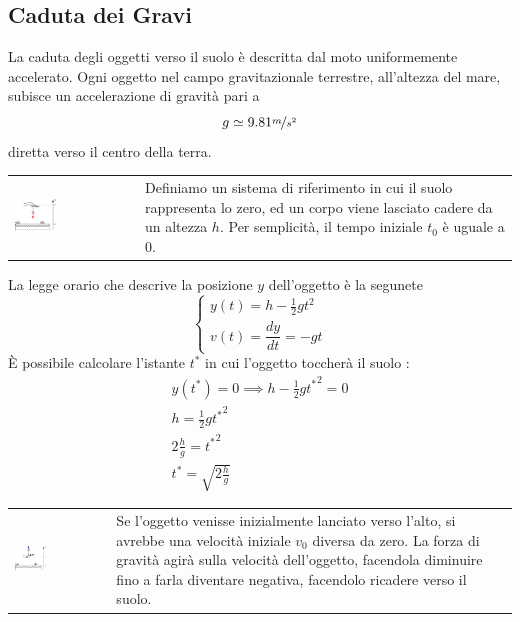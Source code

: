 \documentclass[10pt, letterpaper]{report}
\begin{document}
\subsection{Caduta dei Gravi}
La caduta degli oggetti verso il suolo è descritta dal moto uniformemente 
        accelerato. Ogni oggetto nel campo gravitazionale terrestre, all'altezza del mare, subisce un 
        accelerazione di gravità pari a 
        $$ g\simeq 9.81 \nicefrac{m}{s^2}$$ 
        diretta verso il centro della terra. 
\begin{center}
	\begin{tabular}{>{\centering\arraybackslash}m{3in}>{\centering\arraybackslash}m{3in}}
        \includegraphics[width=0.35\textwidth]{images/oggettoLasciatoCadere.eps} & Definiamo un sistema di riferimento in cui il suolo 
        rappresenta lo zero, ed un corpo viene lasciato cadere da un altezza $h$. Per semplicità, 
        il tempo iniziale $t_0$ è uguale a $0$.
		\\
	\end{tabular}
\end{center}
La legge orario che descrive la posizione $y$ dell'oggetto è la segunete 
$$ \begin{cases}
    y(t)=h-\frac{1}{2}gt^2 \\ 
    v(t)=\dfrac{dy}{dt}=-gt
\end{cases}$$
È possibile calcolare l'istante $t^*$ in cui l'oggetto toccherà il suolo : 
\begin{eqnarray} y(t^*)=0\implies h-\frac{1}{2}g{t^*}^2 =0 \\ 
     h=\frac{1}{2}g{t^*}^2 \\ 
     2\frac{h}{g}={t^*}^2 \\ 
     t^*=\sqrt{2\frac{h}{g}}
\end{eqnarray}
\begin{center}
	\begin{tabular}{>{\centering\arraybackslash}m{3in}>{\centering\arraybackslash}m{3in}}
        \includegraphics[width=0.35\textwidth]{images/graveCaduta2.eps} & Se l'oggetto venisse inizialmente lanciato verso l'alto, si avrebbe una velocità iniziale 
        $v_0$ diversa da zero. La forza di gravità agirà sulla velocità dell'oggetto, facendola diminuire fino a farla 
        diventare negativa, facendolo ricadere verso il suolo.
		\\
	\end{tabular}
\end{center}
\end{document}
